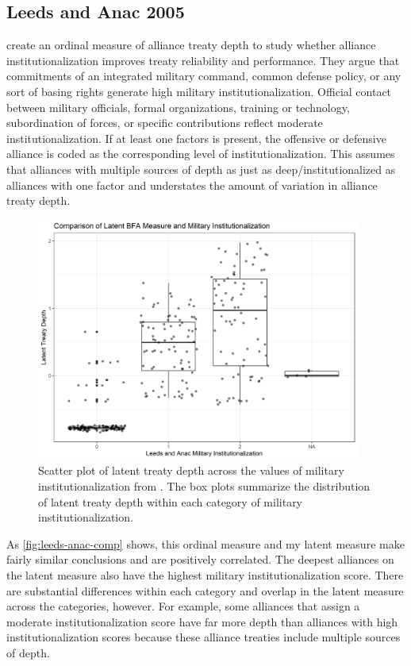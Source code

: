 \documentclass[12pt]{article}
\begin{document}
\subsection{Leeds and Anac 2005}


\citet{LeedsAnac2005} create an ordinal measure of alliance treaty depth to study whether alliance institutionalization improves treaty reliability and performance. 
They argue that commitments of an integrated military command, common defense policy, or any sort of basing rights generate high military institutionalization. 
Official contact between military officials, formal organizations, training or technology, subordination of forces, or specific contributions reflect moderate institutionalization. 
If at least one factors is present, the offensive or defensive alliance is coded as the corresponding level of institutionalization. 
This assumes that alliances with multiple sources of depth as just as deep/institutionalized as alliances with one factor and understates the amount of variation in alliance treaty depth. 


\begin{figure}[htbp]
	\centering
		\includegraphics[width=0.95\textwidth]{leeds-anac-comp.png}
	\caption{Scatter plot of latent treaty depth across the values of military institutionalization from \citet{LeedsAnac2005}. The box plots summarize the distribution of latent treaty depth within each category of military institutionalization.}
	\label{fig:leeds-anac-comp}
\end{figure}


As \autoref{fig:leeds-anac-comp} shows, this ordinal measure and my latent measure make fairly similar conclusions and are positively correlated. 
The deepest alliances on the latent measure also have the highest military institutionalization score. 
There are substantial differences within each category and overlap in the latent measure across the categories, however. 
For example, some alliances that \citet{LeedsAnac2005} assign a moderate institutionalization score have far more depth than alliances with high institutionalization scores because these alliance treaties include multiple sources of depth. 
\end{document}
